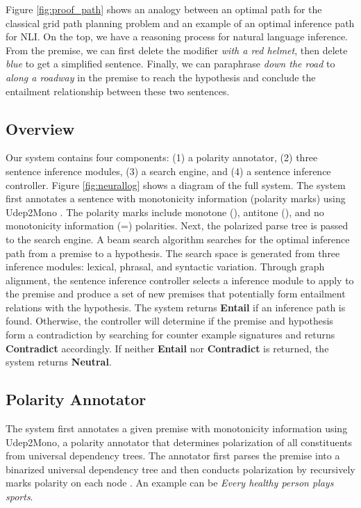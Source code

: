 \documentclass[11pt,a4paper]{article}
\begin{document}
Figure \ref{fig:proof_path} shows an analogy between an optimal path for the classical grid path planning problem and an example of an optimal inference path for NLI. On the top, we have a reasoning process for natural language inference. From the premise, we can first delete the modifier \textit{with a red helmet}, then delete \textit{blue} to get a simplified sentence. Finally, we can paraphrase \textit{down the road} to \textit{along a roadway} in the premise to reach the hypothesis and conclude the entailment relationship between these two sentences.

\subsection{Overview}
Our system contains four components: (1) a polarity annotator, (2) three sentence inference modules, (3) a search engine, and (4) a sentence inference controller. Figure \ref{fig:neurallog} shows a diagram of the full system. The system first annotates a sentence with monotonicity information (polarity marks) using Udep2Mono \cite{chengaoudep2mono}. The polarity marks include monotone (), antitone (), and no monotonicity information (=) polarities. Next, the polarized parse tree is passed to the search engine. A beam search algorithm searches for the optimal inference path from a premise to a hypothesis. The search space is generated from three inference modules: lexical, phrasal, and syntactic variation. Through graph alignment, the sentence inference controller selects a inference module to apply to the premise and produce a set of new premises that potentially form entailment relations with the hypothesis. The system returns \textbf{Entail} if an inference path is found. Otherwise, the controller will determine if the premise and hypothesis form a contradiction by searching for counter example signatures and returns \textbf{Contradict} accordingly. If neither \textbf{Entail} nor \textbf{Contradict} is returned, the system returns \textbf{Neutral}.

\subsection{Polarity Annotator}
The system first annotates a given premise with monotonicity information using Udep2Mono, a polarity annotator that determines polarization of all constituents
from universal dependency trees. The annotator first parses the premise into a binarized universal dependency tree and then conducts polarization by recursively marks polarity on each node . An example can be \textit{Every healthy person plays sports}.
\end{document}
